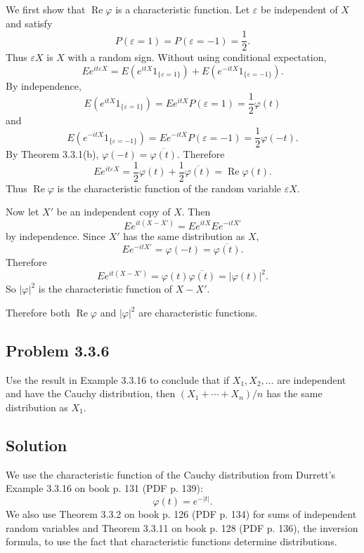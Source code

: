 \documentclass[a4paper,12pt,openany]{article}
\theoremstyle{plain}
\theoremstyle{definition}
\begin{document}
We first show that $\operatorname{Re}\varphi$ is a characteristic function. Let $\varepsilon$ be independent of $X$ and satisfy
\[
P(\varepsilon=1)=P(\varepsilon=-1)=\frac12.
\]
Thus $\varepsilon X$ is $X$ with a random sign. Without using conditional expectation,
\[
Ee^{it\varepsilon X}
=
E(e^{itX}1_{\{\varepsilon=1\}})
+
E(e^{-itX}1_{\{\varepsilon=-1\}}).
\]
By independence,
\[
E(e^{itX}1_{\{\varepsilon=1\}})
=
Ee^{itX}P(\varepsilon=1)
=
\frac12\varphi(t)
\]
and
\[
E(e^{-itX}1_{\{\varepsilon=-1\}})
=
Ee^{-itX}P(\varepsilon=-1)
=
\frac12\varphi(-t).
\]
By Theorem 3.3.1(b), $\varphi(-t)=\overline{\varphi(t)}$. Therefore
\[
Ee^{it\varepsilon X}
=
\frac12\varphi(t)+\frac12\overline{\varphi(t)}
=
\operatorname{Re}\varphi(t).
\]
Thus $\operatorname{Re}\varphi$ is the characteristic function of the random variable $\varepsilon X$.

\medskip

Now let $X'$ be an independent copy of $X$. Then
\[
Ee^{it(X-X')}
=
Ee^{itX}Ee^{-itX'}
\]
by independence. Since $X'$ has the same distribution as $X$,
\[
Ee^{-itX'}
=
\varphi(-t)
=
\overline{\varphi(t)}.
\]
Therefore
\[
Ee^{it(X-X')}
=
\varphi(t)\overline{\varphi(t)}
=
|\varphi(t)|^2.
\]
So $|\varphi|^2$ is the characteristic function of $X-X'$.

\medskip

Therefore both $\operatorname{Re}\varphi$ and $|\varphi|^2$ are characteristic functions.

\subsection*{Problem 3.3.6}

Use the result in Example 3.3.16 to conclude that if $X_1,X_2,\ldots$ are independent and have the Cauchy distribution, then $(X_1+\cdots+X_n)/n$ has the same distribution as $X_1$.

\subsection*{Solution}

We use the characteristic function of the Cauchy distribution from Durrett's Example 3.3.16 on book p. 131 (PDF p. 139):
\[
\varphi(t)=e^{-|t|}.
\]
We also use Theorem 3.3.2 on book p. 126 (PDF p. 134) for sums of independent random variables and Theorem 3.3.11 on book p. 128 (PDF p. 136), the inversion formula, to use the fact that characteristic functions determine distributions.
\end{document}
